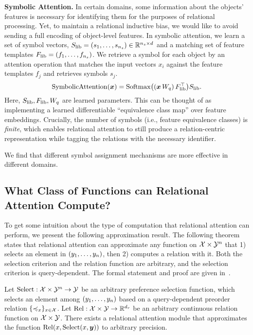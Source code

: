 \textbf{Symbolic Attention.} In certain domains, some information about the objects' features is necessary for identifying them for the purposes of relational processing. Yet, to maintain a relational inductive bias, we would like to avoid sending a full encoding of object-level features. In symbolic attention, we learn a set of symbol vectors, $S_\mathrm{lib} = (s_1, \ldots, s_{n_s}) \in \mathbb{R}^{n_s \times d}$ and a matching set of feature templates $F_\mathrm{lib} = (f_1, \ldots, f_{n_s})$. We retrieve a symbol for each object by an attention operation that matches the input vectors $x_i$ against the feature templates $f_j$ and retrieves symbols $s_j$.
\begin{equation}
  \mathrm{SymbolicAttention}(\bm{x}) = \mathrm{Softmax}\big((\bm{x} \, W_q)\, F_\mathrm{lib}^\top\big) S_\mathrm{lib}.
\end{equation}
Here, $S_\mathrm{lib}, F_\mathrm{lib}, W_q$ are learned parameters. This can be thought of as implementing a learned differentiable ``equivalence class map'' over feature embeddings. Crucially, the number of symbols (i.e., feature equivalence classes) is \textit{finite}, which enables relational attention to still produce a relation-centric representation while tagging the relations with the necessary identifier.

We find that different symbol assignment mechanisms are more effective in different domains.


\subsection{What Class of Functions can Relational Attention Compute?}\label{ssec:approx}
To get some intuition about the type of computation that relational attention can perform, we present the following approximation result. The following theorem states that relational attention can approximate any function on ${\mathcal{X}} \times {\mathcal{Y}}^n$ that 1) selects an element in $(y_1, \ldots, y_n)$, then 2) computes a relation with it. Both the selection criterion and the relation function are arbitrary, and the selection criterion is query-dependent. The formal statement and proof are given in~.
\begin{theorem}[Informal]\label{theorem:func_class}
  Let $\mathrm{Select}: {\mathcal{X}} \times {\mathcal{Y}}^n \to {\mathcal{Y}}$ be an arbitrary preference selection function, which selects an element among $(y_1, \ldots, y_n)$ based on a query-dependent preorder relation $\{\preccurlyeq_x\}_{x \in {\mathcal{X}}}$. Let $\mathrm{Rel}: {\mathcal{X}} \times {\mathcal{Y}} \to \mathbb{R}^{d_r}$ be an arbitrary continuous relation function on ${\mathcal{X}} \times {\mathcal{Y}}$. There exists a relational attention module that approximates the function $\mathrm{Rel}(x, \mathrm{Select}(x, \bm{y}))$ to arbitrary precision.
\end{theorem}
